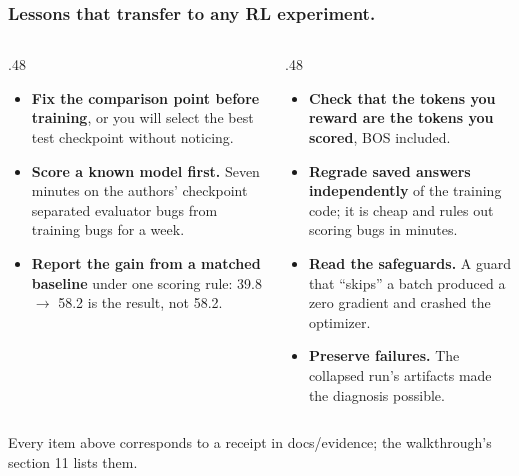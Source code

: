 \documentclass[aspectratio=169,11pt]{beamer}
\newcommand{\source}[1]{\vfill{\scriptsize\color{Gray}#1\par}}
\begin{document}
\begin{frame}[t]
\frametitle{Lessons that transfer to any RL experiment.}
\small
\begin{columns}[T,onlytextwidth]
\begin{column}{.48\textwidth}
\begin{itemize}
\item \textbf{Fix the comparison point before training}, or you will select the best test checkpoint without noticing.
\item \textbf{Score a known model first.} Seven minutes on the authors' checkpoint separated evaluator bugs from training bugs for a week.
\item \textbf{Report the gain from a matched baseline} under one scoring rule: 39.8 $\to$ 58.2 is the result, not 58.2.
\end{itemize}
\end{column}
\begin{column}{.48\textwidth}
\begin{itemize}
\item \textbf{Check that the tokens you reward are the tokens you scored}, BOS included.
\item \textbf{Regrade saved answers independently} of the training code; it is cheap and rules out scoring bugs in minutes.
\item \textbf{Read the safeguards.} A guard that ``skips'' a batch produced a zero gradient and crashed the optimizer.
\item \textbf{Preserve failures.} The collapsed run's artifacts made the diagnosis possible.
\end{itemize}
\end{column}
\end{columns}
\source{Every item above corresponds to a receipt in docs/evidence; the walkthrough's section 11 lists them.}
\end{frame}
\end{document}
